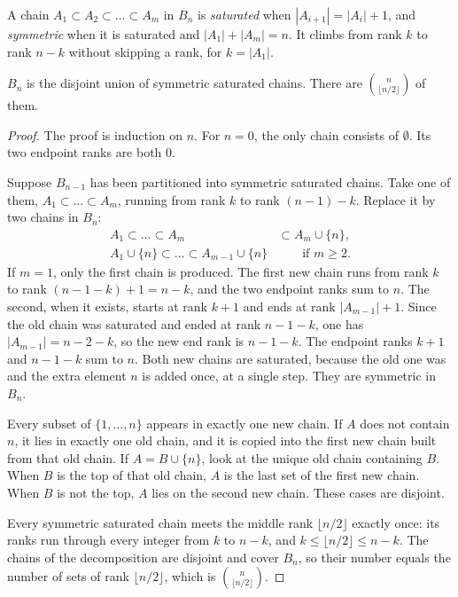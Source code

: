 A chain $A_1\subset A_2\subset\dots\subset A_m$ in $B_n$ is \emph{saturated} when $|A_{i+1}|=|A_i|+1$, and \emph{symmetric} when it is saturated and $|A_1|+|A_m|=n$. It climbs from rank $k$ to rank $n-k$ without skipping a rank, for $k=|A_1|$.

\begin{theorem}\label{orders:thm:scd}
$B_n$ is the disjoint union of symmetric saturated chains. There are $\binom n{\lfloor n/2\rfloor}$ of them.
\end{theorem}
\begin{proof}
The proof is induction on $n$. For $n=0$, the only chain consists of $\emptyset$. Its two endpoint ranks are both $0$.

Suppose $B_{n-1}$ has been partitioned into symmetric saturated chains. Take one of them, $A_1\subset\dots\subset A_m$, running from rank $k$ to rank $(n-1)-k$. Replace it by two chains in $B_n$:
\begin{align*}
A_1\subset\dots\subset A_m&\subset A_m\cup\{n\},\\
A_1\cup\{n\}\subset\dots\subset A_{m-1}\cup\{n\}&\qquad\text{if }m\ge 2.
\end{align*}
If $m=1$, only the first chain is produced. The first new chain runs from rank $k$ to rank $(n-1-k)+1=n-k$, and the two endpoint ranks sum to $n$. The second, when it exists, starts at rank $k+1$ and ends at rank $|A_{m-1}|+1$. Since the old chain was saturated and ended at rank $n-1-k$, one has $|A_{m-1}|=n-2-k$, so the new end rank is $n-1-k$. The endpoint ranks $k+1$ and $n-1-k$ sum to $n$. Both new chains are saturated, because the old one was and the extra element $n$ is added once, at a single step. They are symmetric in $B_n$.

Every subset of $\{1,\dots,n\}$ appears in exactly one new chain. If $A$ does not contain $n$, it lies in exactly one old chain, and it is copied into the first new chain built from that old chain. If $A=B\cup\{n\}$, look at the unique old chain containing $B$. When $B$ is the top of that old chain, $A$ is the last set of the first new chain. When $B$ is not the top, $A$ lies on the second new chain. These cases are disjoint.

Every symmetric saturated chain meets the middle rank $\lfloor n/2\rfloor$ exactly once: its ranks run through every integer from $k$ to $n-k$, and $k\le\lfloor n/2\rfloor\le n-k$. The chains of the decomposition are disjoint and cover $B_n$, so their number equals the number of sets of rank $\lfloor n/2\rfloor$, which is $\binom n{\lfloor n/2\rfloor}$.
\end{proof}

